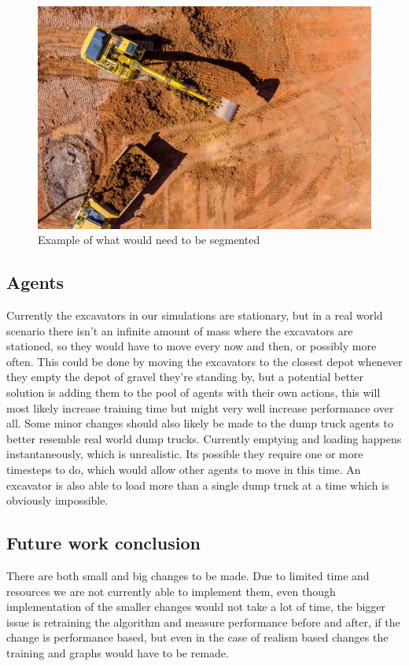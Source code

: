 \documentclass[conference]{IEEEtran}
\begin{document}
\begin{figure}[h!]
	\includegraphics[width=\columnwidth]{graphs/construction_site.jpg}
	\caption{Example of what would need to be segmented}
\end{figure}

\subsection{Agents}
Currently the excavators in our simulations are stationary, but in a real world scenario there isn't an infinite amount of mass where the excavators are stationed, so they would have to move every now and then, or possibly more often.
This could be done by moving the excavators to the closest depot whenever they empty the depot of gravel they're standing by, but a potential better solution is adding them to the pool of agents with their own actions, this will most likely increase training time but might very well increase performance over all.
Some minor changes should also likely be made to the dump truck agents to better resemble real world dump trucks.
Currently emptying and loading happens instantaneously, which is unrealistic. Its possible they require one or more timesteps to do, which would allow other agents to move in this time.
An excavator is also able to load more than a single dump truck at a time which is obviously impossible.

\subsection{Future work conclusion}
There are both small and big changes to be made. Due to limited time and resources we are not currently able to implement them, even though implementation of the smaller changes would not take a lot of time, the bigger issue is retraining the algorithm and measure performance before and after, if the change is performance based, but even in the case of realism based changes the training and graphs would have to be remade.
\end{document}
